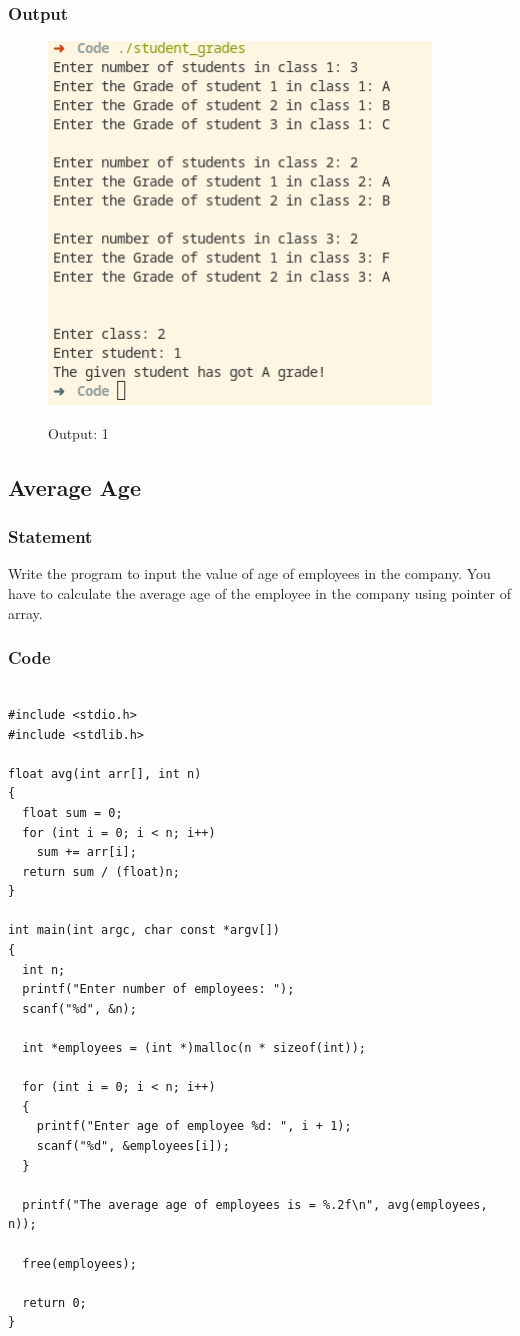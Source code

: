 \subsubsection{Output}
\begin{figure}[!htb]
  \centering
  \includegraphics[width=4in]{Images/1.png}
  \label{output:1}
  \caption{Output: 1}
\end{figure}

\pagebreak
\subsection{Average Age}

\subsubsection{Statement}
Write the program to input the value of age of employees in the company. You have to
calculate the average age of the employee in the company using pointer of array.

\subsubsection{Code}
\begin{verbatim} 

#include <stdio.h>
#include <stdlib.h>

float avg(int arr[], int n)
{
  float sum = 0;
  for (int i = 0; i < n; i++)
    sum += arr[i];
  return sum / (float)n;
}

int main(int argc, char const *argv[])
{
  int n;
  printf("Enter number of employees: ");
  scanf("%d", &n);

  int *employees = (int *)malloc(n * sizeof(int));

  for (int i = 0; i < n; i++)
  {
    printf("Enter age of employee %d: ", i + 1);
    scanf("%d", &employees[i]);
  }

  printf("The average age of employees is = %.2f\n", avg(employees, n));

  free(employees);

  return 0;
}

\end{verbatim}

